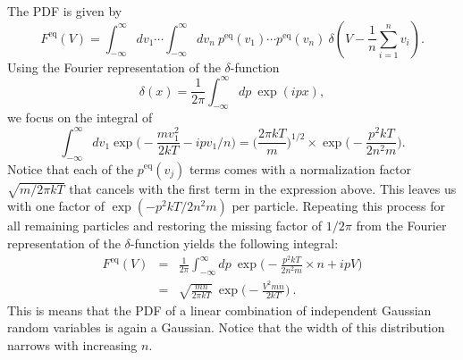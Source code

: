 The PDF is given by
\begin{equation}
F^\text{eq}(V) = \int_{-\infty}^{\infty} dv_1 \cdots \int_{-\infty}^{\infty} dv_n ~ p^\text{eq}(v_1) \cdots p^\text{eq}(v_n) ~ \delta(V - \frac{1}{n}\sum_{i=1}^{n} v_i).
\end{equation}
Using the Fourier representation of the $\delta$-function
\begin{equation}
\delta(x) = \frac{1}{2\pi} \int_{-\infty}^{\infty} dp ~ \exp(i p x),
\end{equation}
we focus on the integral of 
\begin{equation}
\int_{-\infty}^{\infty} dv_1 \exp\bigg(-\frac{m v_1^2}{2 k T} -i p v_1/n\bigg) =  \bigg( \frac{2\pi k T}{m}\bigg)^{1/2} \times \exp\bigg(-\frac{p^2 k T }{2 n^2 m}\bigg).
\end{equation}
Notice that each of the $p^\text{eq}(v_j)$ terms comes with a normalization factor $\sqrt{m/2 \pi k T}$ that cancels with the first term in the expression above. This leaves us with one factor of $\exp(-p^2 k T/2 n^2 m)$ per particle. Repeating this process for all remaining particles and restoring the missing factor of $1/2\pi$ from the Fourier representation of the $\delta$-function yields the following integral:
\begin{eqnarray}
F^\text{eq}(V) &=& \frac{1}{2\pi}\int_{-\infty}^{\infty} dp ~ \exp\bigg(-\frac{p^2 k T }{2 n^2 m} \times n + i p V\bigg)\\
&=&  \boxed{\sqrt{\frac{m n}{2\pi k T}} ~ \exp\bigg(-\frac{V^2 m n }{2 k T} \bigg)}~.
\end{eqnarray}
This is means that the PDF of a linear combination of independent Gaussian random variables is again a Gaussian. Notice that the width of this distribution narrows with increasing $n$.